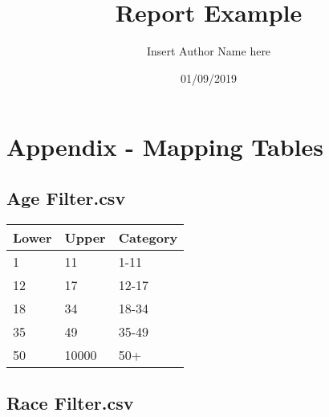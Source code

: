 \documentclass{article}%
\title{Report Example}%
\author{Insert Author Name here}%
\date{01/09/2019}%
\begin{document}
%
\normalsize%
\maketitle%
%
%
%
%
\clearpage%
\section{Appendix {-} Mapping Tables}%
\label{sec:Appendix {-} Mapping Tables}%

%
\subsection{Age Filter.csv}%
\label{subsec:Age Filter.csv}%

%
\begin{tabular}{l l l}%
\hline%
Lower&Upper&Category\\%
\hline%
1&11&1{-}11\\%
12&17&12{-}17\\%
18&34&18{-}34\\%
35&49&35{-}49\\%
50&10000&50+\\%
\hline%
\end{tabular}%
\linebreak%
\subsection{Race Filter.csv}%
\label{subsec:Race Filter.csv}%
\end{document}
